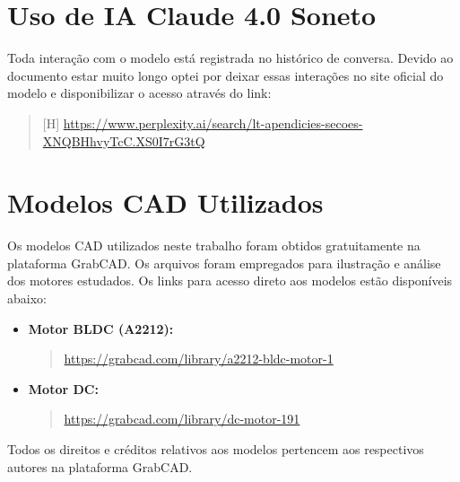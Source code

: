 \documentclass[11pt]{article}
\begin{document}


\newpage
    
    \nocite{SEMESCOVA}
    \nocite{MOTRCC}
    \nocite{QUEROBOLSA}
    \nocite{BRASILESCOLA}
    \nocite{CORRENTEFOUCAULT}
    \nocite{LEIFARADAY}
    \nocite{MANUALLATEX}
    \nocite{pepadun}

    
    

\newpage 
\begin{appendices}

    \section{Uso de IA \textbf{Claude 4.0 Soneto}}
        \noindent Toda interação com o modelo está registrada no histórico de conversa. Devido ao documento estar muito longo optei por deixar essas interações no site oficial do modelo
        e disponibilizar o acesso através do link:
        \begin{quote}[H]
            \url{https://www.perplexity.ai/search/lt-apendicies-secoes-XNQBHhvyTcC.XS0I7rG3tQ}    
        \end{quote}
        
    \section{Modelos CAD Utilizados}
        \noindent Os modelos CAD utilizados neste trabalho foram obtidos gratuitamente na plataforma GrabCAD. Os arquivos foram empregados para ilustração e análise dos motores estudados. Os links para acesso direto aos modelos estão disponíveis abaixo:

        \begin{itemize}
            \item \textbf{Motor BLDC (A2212):}
            \begin{quote}
                \url{https://grabcad.com/library/a2212-bldc-motor-1}
            \end{quote}

            \item \textbf{Motor DC:}
            \begin{quote}
                \url{https://grabcad.com/library/dc-motor-191}
            \end{quote}
        \end{itemize}

        \noindent Todos os direitos e créditos relativos aos modelos pertencem aos respectivos autores na plataforma GrabCAD.


\end{appendices}
\end{document}
